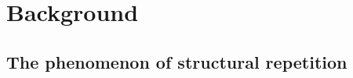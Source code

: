 %
%
%






\setlength{\parindent}{0pt}
\setlength{\parskip}{0pt} %
% 
% 
% 
% 
% 

\cleardoublepage
{}
\tableofcontents

% 


\setlength{\parskip}{1em}


\mainmatter

\cleardoublepage
\part{Background}
\chapter{The phenomenon of structural repetition}
    
    
